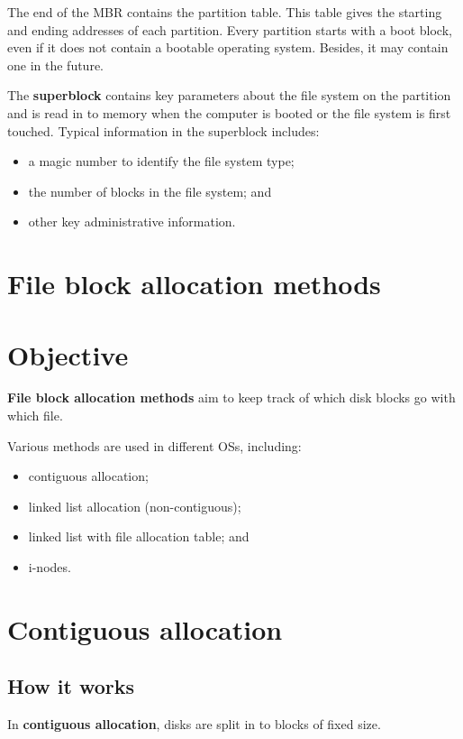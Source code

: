 \documentclass[a4paper]{systems-software}
\begin{document}
\newpage

The end of the MBR contains the partition table. This table gives the starting and ending addresses of each partition. Every partition starts with a boot block, even if it does not contain a bootable operating system. Besides, it may contain one in the future.

The \textbf{superblock} contains key parameters about the file system on the partition and is read in to memory when the computer is booted or the file system is first touched. Typical information in the superblock includes:
\begin{itemize}
	\item a magic number to identify the file system type;
	\item the number of blocks in the file system; and
	\item other key administrative information.
\end{itemize}


\section{File block allocation methods}

\section*{Objective}

\textbf{File block allocation methods} aim to keep track of which disk blocks go with which file.

Various methods are used in different OSs, including:
\begin{itemize}
	\item contiguous allocation;
	\item linked list allocation (non-contiguous);
	\item linked list with file allocation table; and
	\item i-nodes.
\end{itemize}


\section*{Contiguous allocation}

\subsection*{How it works}

In \textbf{contiguous allocation}, disks are split in to blocks of fixed size.
\end{document}
